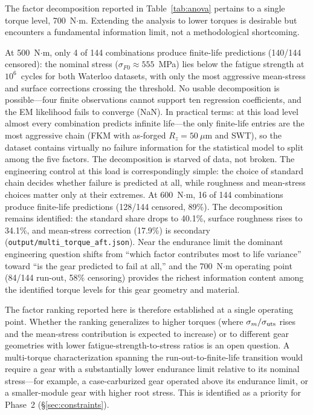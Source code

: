 \documentclass[twocolumn,12pt,a4paper]{article}
\begin{document}
The factor decomposition reported in Table~\ref{tab:anova} pertains to
a single torque level, 700~N$\cdot$m. Extending the analysis to lower
torques is desirable but encounters a fundamental information limit,
not a methodological shortcoming.

At 500~N$\cdot$m, only 4 of 144 combinations produce finite-life
predictions (140/144 censored): the nominal stress
($\sigma_{F0} \approx 555$~MPa) lies below the fatigue strength
at $10^6$~cycles for both Waterloo datasets, with only the most
aggressive mean-stress and surface corrections crossing the
threshold. No usable decomposition is
possible---four finite observations cannot support ten regression
coefficients, and the EM likelihood fails to converge (NaN).
In practical terms: at this load level almost every combination
predicts infinite life---the only finite-life entries are the most
aggressive chain (FKM with as-forged $R_z{=}50~\mu$m and SWT), so the
dataset contains virtually no failure information for the statistical
model to split among the five factors. The decomposition is starved of
data, not broken. The engineering control at this load is
correspondingly simple: the choice of standard chain decides whether
failure is predicted at all, while roughness and mean-stress choices
matter only at their extremes.
At 600~N$\cdot$m, 16 of 144 combinations produce finite-life
predictions (128/144 censored, 89\%). The decomposition remains
identified: the standard share drops to 40.1\%, surface roughness
rises to 34.1\%, and mean-stress correction (17.9\%) is secondary
(\texttt{output/multi\_torque\_aft.json}). Near the endurance limit
the dominant engineering question shifts from ``which factor
contributes most to life variance'' toward ``is the gear predicted to
fail at all,'' and the 700~N$\cdot$m operating point (84/144 run-out,
58\% censoring) provides the richest information content among the
identified torque levels for this gear geometry and material.

The factor ranking reported here is therefore established at a single
operating point. Whether the ranking generalizes to higher torques
(where $\sigma_m/\sigma_{\rm uts}$ rises and the mean-stress
contribution is expected to increase) or to different gear geometries
with lower fatigue-strength-to-stress ratios is an open question. A
multi-torque characterization spanning the run-out-to-finite-life
transition would require a gear with a substantially lower endurance
limit relative to its nominal stress---for example, a
case-carburized gear operated above its endurance limit, or a
smaller-module gear with higher root stress. This is identified as a
priority for Phase~2 (\S\ref{sec:constraints}).
\end{document}
